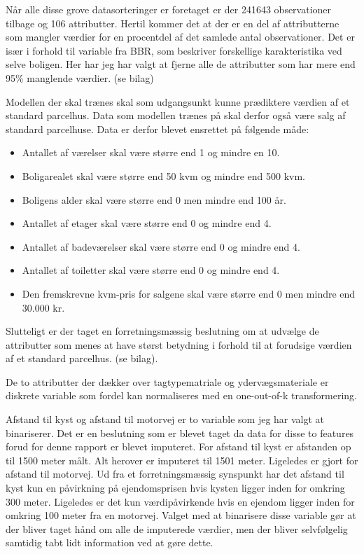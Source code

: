 \documentclass{report}
\begin{document}
Når alle disse grove datasorteringer er foretaget er der 241643 observationer tilbage og 106 attributter.
Hertil kommer det at der er en del af attributterne som mangler værdier for en procentdel af det samlede antal observationer. Det er især i forhold til variable fra BBR, som beskriver forskellige karakteristika ved selve boligen. Her har jeg har valgt at fjerne alle de attributter som har mere end 95\% manglende værdier. (se bilag)

Modellen der skal trænes skal som udgangsunkt kunne prædiktere værdien af et standard parcelhus.  Data som modellen trænes på skal derfor også være salg af standard parcelhuse.
Data er derfor blevet ensrettet på følgende måde:

\begin{itemize}
  \item Antallet af værelser skal være større end 1 og mindre en 10.
  \item Boligarealet skal være større end 50 kvm og mindre end 500 kvm.
  \item Boligens alder skal være større end 0 men mindre end 100 år.
  \item Antallet af etager skal være større end 0 og mindre end 4.
  \item Antallet af badeværelser skal være større end 0 og mindre end 4.
  \item Antallet af toiletter skal være større end 0 og mindre end 4.
  \item Den fremskrevne kvm-pris for salgene skal være større end 0 men mindre end 30.000 kr. 
\end{itemize}

Slutteligt er der taget en forretningsmæssig beslutning om at udvælge de attributter som menes at have størst betydning i forhold til at forudsige værdien af et standard parcelhus.
(se bilag).

De to attributter der dækker over tagtypematriale og ydervægsmateriale er diskrete variable som fordel kan normaliseres med en one-out-of-k transformering.

Afstand til kyst og afstand til motorvej er to variable som jeg har valgt at binariserer. Det er en beslutning som er blevet taget da data for disse to features forud for denne rapport er blevet imputeret. For afstand til kyst er afstanden op til 1500 meter målt. Alt herover er imputeret til 1501 meter. Ligeledes er gjort for afstand til motorvej. Ud fra et forretningsmæssig synspunkt har det afstand til kyst kun en påvirkning på ejendomsprisen hvis kysten ligger inden for omkring 300 meter. Ligeledes er det kun værdipåvirkende hvis en ejendom ligger inden for omkring 100 meter fra en motorvej. Valget med at binarisere disse variable gør at der bliver taget hånd om alle de imputerede værdier, men der bliver selvfølgelig samtidig tabt lidt information ved at gøre dette.
\end{document}
